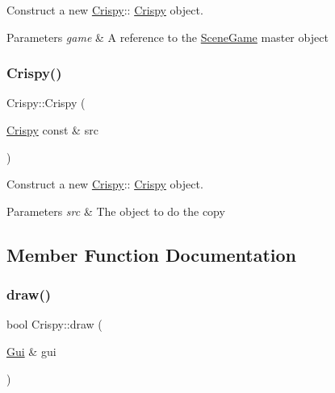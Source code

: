 Construct a new \hyperlink{class_crispy}{Crispy}\+:\+: \hyperlink{class_crispy}{Crispy} object. 


\begin{DoxyParams}{Parameters}
{\em game} & A reference to the \hyperlink{class_scene_game}{Scene\+Game} master object \\
\hline
\end{DoxyParams}
\mbox{\label{class_crispy_a648bbdda44870a4df05617f50130cb07}} 
\subsubsection{\texorpdfstring{Crispy()}{Crispy()}\hspace{0.1cm}{\footnotesize\ttfamily [2/2]}}
{\footnotesize\ttfamily Crispy\+::\+Crispy (\begin{DoxyParamCaption}\item[{\hyperlink{class_crispy}{Crispy} const \&}]{src }\end{DoxyParamCaption})}



Construct a new \hyperlink{class_crispy}{Crispy}\+:\+: \hyperlink{class_crispy}{Crispy} object. 


\begin{DoxyParams}{Parameters}
{\em src} & The object to do the copy \\
\hline
\end{DoxyParams}


\subsection{Member Function Documentation}
\mbox{\label{class_crispy_a266bebd70e55a7d08ba1688af0f4adf0}} 
\subsubsection{\texorpdfstring{draw()}{draw()}}
{\footnotesize\ttfamily bool Crispy\+::draw (\begin{DoxyParamCaption}\item[{\hyperlink{class_gui}{Gui} \&}]{gui }\end{DoxyParamCaption})\hspace{0.3cm}{\ttfamily [virtual]}}



